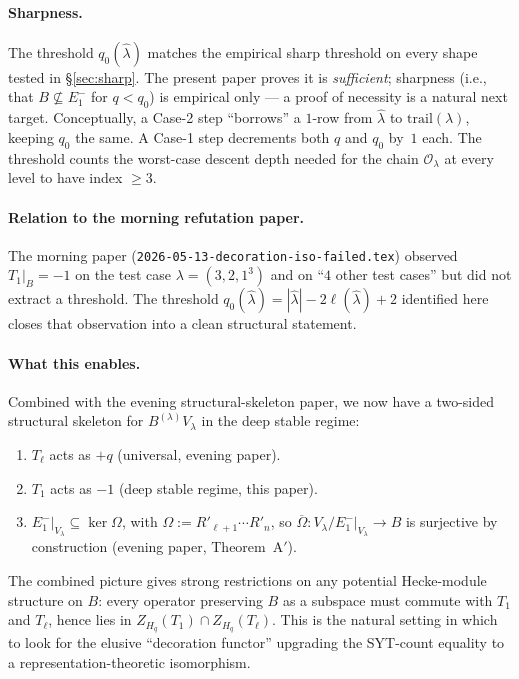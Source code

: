 \documentclass[11pt]{article}
\theoremstyle{definition}
\begin{document}
\paragraph{Sharpness.}
The threshold $q_0(\hat\lambda)$ matches the empirical sharp
threshold on every shape tested in \S\ref{sec:sharp}. The present
paper proves it is \emph{sufficient}; sharpness (i.e., that
$B \not\subseteq E_1^-$ for $q < q_0$) is empirical only --- a
proof of necessity is a natural next target. Conceptually, a Case-2
step ``borrows'' a $1$-row from $\hat\lambda$ to $\mathrm{trail}(\lambda)$,
keeping $q_0$ the same. A Case-1 step decrements both $q$ and
$q_0$ by~$1$ each. The threshold counts the worst-case descent
depth needed for the chain $\mathcal{O}_\lambda$ at every level to
have index $\ge 3$.

\paragraph{Relation to the morning refutation paper.}
The morning paper
(\texttt{2026-05-13-decoration-iso-failed.tex}) observed
$T_1 |_B = -1$ on the test case $\lambda = (3, 2, 1^3)$ and on
``$4$ other test cases'' but did not extract a threshold. The
threshold $q_0(\hat\lambda) = |\hat\lambda| - 2\ell(\hat\lambda) + 2$
identified here closes that observation into a clean structural
statement.

\paragraph{What this enables.}
Combined with the evening structural-skeleton paper, we now have a
two-sided structural skeleton for $B^{(\lambda)} V_\lambda$ in the
deep stable regime:
\begin{enumerate}[leftmargin=2em,topsep=0.2em,itemsep=0.1em]
\item $T_\ell$ acts as $+q$ (universal, evening paper).
\item $T_1$ acts as $-1$ (deep stable regime, this paper).
\item $E_1^-|_{V_\lambda} \subseteq \ker \Omega$, with
$\Omega := R'_{\ell+1}\cdots R'_n$, so
$\overline{\Omega} : V_\lambda / E_1^-|_{V_\lambda} \to B$ is
surjective by construction (evening paper, Theorem~A$'$).
\end{enumerate}
The combined picture gives strong restrictions on any potential
Hecke-module structure on $B$: every operator preserving $B$ as a
subspace must commute with $T_1$ and $T_\ell$, hence lies in
$Z_{H_q}(T_1) \cap Z_{H_q}(T_\ell)$. This is the natural setting in
which to look for the elusive ``decoration functor'' upgrading the
SYT-count equality to a representation-theoretic isomorphism.
\end{document}
